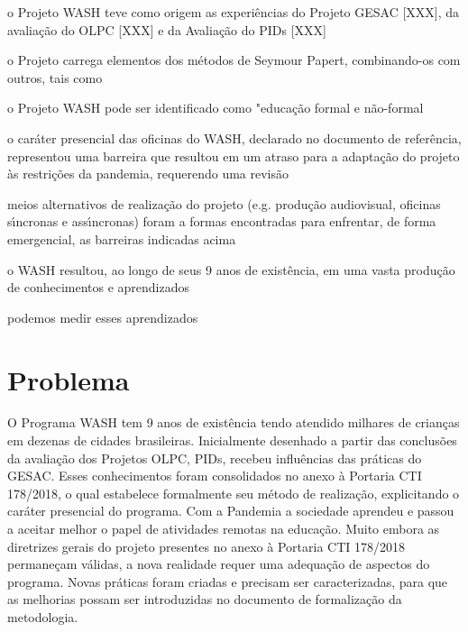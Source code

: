 \documentclass[
12pt,		%
openright,	%
twoside,  %
a4paper,			%
chapter=TITLE,		%
english,			%
french,				%
spanish,			%
brazil				%
]{USPSC-classe/USPSC}
\begin{document}
\begin{alineas}
\item o Projeto WASH teve como origem as experi\^encias do Projeto GESAC [XXX], da avalia\c{c}\~ao do OLPC [XXX] e da Avalia\c{c}\~ao do PIDs [XXX]
\item o Projeto carrega elementos dos m\'etodos de Seymour Papert, combinando-os com outros, tais como
\item o Projeto WASH pode ser identificado como "educa\c{c}\~ao  formal e n\~ao-formal
\item o car\'ater presencial das oficinas do WASH, declarado no documento de refer\^encia, representou uma barreira que resultou em um atraso para a adapta\c{c}\~ao do projeto \`as restri\c{c}\~oes da pandemia, requerendo uma revis\~ao
\item meios alternativos de realiza\c{c}\~ao do projeto (e.g. produ\c{c}\~ao audiovisual, oficinas s\'{\i}ncronas e ass\'{\i}ncronas) foram a formas encontradas para enfrentar, de forma emergencial, as barreiras indicadas acima
\item o WASH resultou, ao longo de seus 9 anos de exist\^encia, em uma vasta produ\c{c}\~ao de conhecimentos e aprendizados
\item podemos medir  esses aprendizados 
\end{alineas}

\section[Problema]{Problema}\label{Problema}
O Programa WASH tem 9 anos de exist\^encia tendo atendido milhares de crian\c{c}as em dezenas de cidades brasileiras. Inicialmente desenhado a partir das conclus\~oes da avalia\c{c}\~ao dos Projetos OLPC, PIDs, recebeu influ\^encias das pr\'aticas do GESAC. Esses conhecimentos foram consolidados no anexo \`a Portaria CTI 178/2018, o qual estabelece formalmente seu m\'etodo de realiza\c{c}\~ao, explicitando o car\'ater presencial do programa. Com a Pandemia a sociedade aprendeu e passou a aceitar melhor o papel de atividades remotas na educa\c{c}\~ao. Muito embora as diretrizes gerais do projeto presentes no anexo \`a Portaria CTI 178/2018 permane\c{c}am v\'alidas, a nova realidade requer uma adequa\c{c}\~ao de aspectos do programa. Novas pr\'aticas foram criadas e precisam ser caracterizadas, para que as melhorias possam ser introduzidas no documento de formaliza\c{c}\~ao da metodologia.
\end{document}
